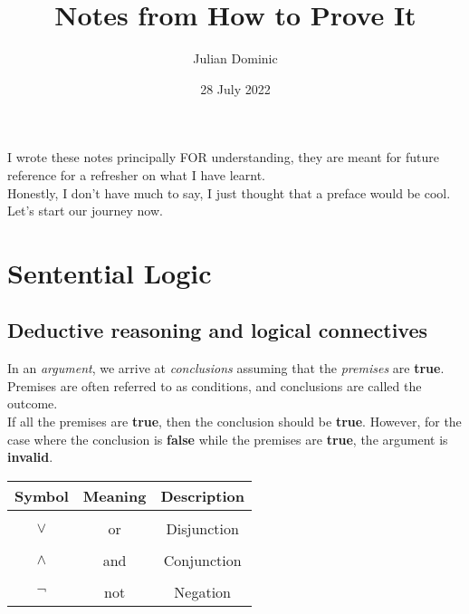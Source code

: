 \documentclass[../setup.tex]{subfiles}
\begin{document}
\title{Notes from How to Prove It}
\author{Julian Dominic}
\date{28 July 2022}
\maketitle
\clearpage

\newcommand{\prefacename}{Preface}
\newenvironment{preface}{
    {\noindent \bfseries \Huge \prefacename}
    \begin{center}
        \thispagestyle{plain}
    \end{center}%
}


\preface
I wrote these notes principally FOR understanding, they are meant for future reference for a refresher on what I have learnt. \\
Honestly, I don't have much to say, I just thought that a preface would be cool. Let's start our journey now.



\tableofcontents
{}
\clearpage

\setcounter{page}{1}

\section{Sentential Logic}
\subsection{Deductive reasoning and logical connectives}
In an \textit{argument}, we arrive at \textit{conclusions} assuming that the \textit{premises} are \textbf{true}. \\ 
Premises are often referred to as conditions, and conclusions are called the outcome. \\
If all the premises are \textbf{true}, then the conclusion should be \textbf{true}. However, for the case where the conclusion is \textbf{false} while the premises are \textbf{true}, the argument is \textbf{invalid}.

\begin{tabular}{| c | c | c |}
\hline
Symbol & Meaning & Description \\
\hline
& & \\
$\lor$ & or & Disjunction \\
& & \\
$\land$ & and & Conjunction \\
& & \\
$\lnot$ & not & Negation \\
\hline
\end{tabular}
\end{document}
